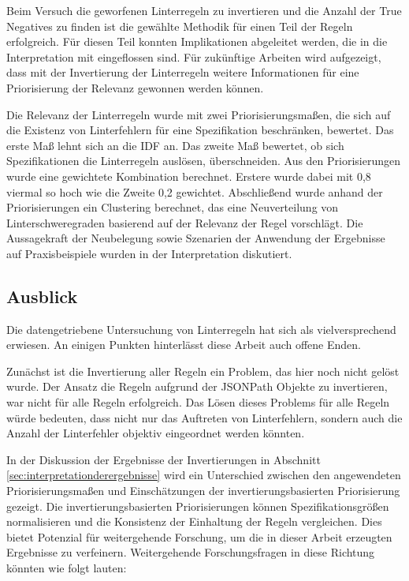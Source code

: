   Beim Versuch die geworfenen Linterregeln zu invertieren und die Anzahl der True Negatives zu finden ist die gewählte Methodik für einen Teil der Regeln erfolgreich. Für diesen Teil konnten Implikationen abgeleitet werden, die in die Interpretation mit eingeflossen sind. Für zukünftige Arbeiten wird aufgezeigt, dass mit der Invertierung der Linterregeln weitere Informationen für eine Priorisierung der Relevanz gewonnen werden können.
  
  Die Relevanz der Linterregeln wurde mit zwei Priorisierungsmaßen, die sich auf die Existenz von Linterfehlern für eine Spezifikation beschränken, bewertet. Das erste Maß lehnt sich an die \acl{IDF} an. Das zweite Maß bewertet, ob sich Spezifikationen die Linterregeln auslösen, überschneiden. Aus den Priorisierungen wurde eine gewichtete Kombination berechnet. Erstere wurde dabei mit 0,8 viermal so hoch wie die Zweite 0,2 gewichtet. Abschließend wurde anhand der Priorisierungen ein Clustering berechnet, das eine Neuverteilung von Linterschweregraden basierend auf der Relevanz der Regel vorschlägt. Die Aussagekraft der Neubelegung sowie Szenarien der Anwendung der Ergebnisse auf Praxisbeispiele wurden in der Interpretation diskutiert.

\subsection{Ausblick} \label{sec:ausblick}
  Die datengetriebene Untersuchung von Linterregeln hat sich als vielversprechend erwiesen. An einigen Punkten hinterlässt diese Arbeit auch offene Enden.

  Zunächst ist die Invertierung aller Regeln ein Problem, das hier noch nicht gelöst wurde. Der Ansatz die Regeln aufgrund der JSONPath Objekte zu invertieren, war nicht für alle Regeln erfolgreich. Das Lösen dieses Problems für alle Regeln würde bedeuten, dass nicht nur das Auftreten von Linterfehlern, sondern auch die Anzahl der Linterfehler objektiv eingeordnet werden könnten.

  In der Diskussion der Ergebnisse der Invertierungen in Abschnitt \ref{sec:interpretationderergebnisse} wird ein Unterschied zwischen den angewendeten Priorisierungsmaßen und Einschätzungen der invertierungsbasierten Priorisierung gezeigt. Die invertierungsbasierten Priorisierungen können Spezifikationsgrößen normalisieren und die Konsistenz der Einhaltung der Regeln vergleichen. Dies bietet Potenzial für weitergehende Forschung, um die in dieser Arbeit erzeugten Ergebnisse zu verfeinern. Weitergehende Forschungsfragen in diese Richtung könnten wie folgt lauten:

